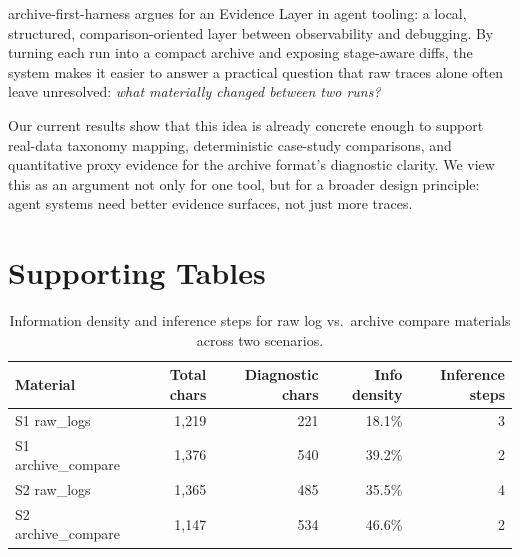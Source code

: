 \documentclass[11pt]{article}
\begin{document}
archive-first-harness argues for an Evidence Layer in agent tooling: a local, structured, comparison-oriented layer between observability and debugging. By turning each run into a compact archive and exposing stage-aware diffs, the system makes it easier to answer a practical question that raw traces alone often leave unresolved: \emph{what materially changed between two runs?}

Our current results show that this idea is already concrete enough to support real-data taxonomy mapping, deterministic case-study comparisons, and quantitative proxy evidence for the archive format's diagnostic clarity. We view this as an argument not only for one tool, but for a broader design principle: agent systems need better evidence surfaces, not just more traces.




\appendix

\section{Supporting Tables}
\label{app:case-studies}

\begin{table}[t!]
  \centering
  \small
  \begin{tabular}{lrrrr}
    \toprule
    \textbf{Material} & \textbf{Total chars} & \textbf{Diagnostic chars} & \textbf{Info density} & \textbf{Inference steps} \\
    \midrule
    S1 raw\_logs         & 1,219 & 221 & 18.1\% & 3 \\
    S1 archive\_compare  & 1,376 & 540 & 39.2\% & 2 \\
    S2 raw\_logs         & 1,365 & 485 & 35.5\% & 4 \\
    S2 archive\_compare  & 1,147 & 534 & 46.6\% & 2 \\
    \bottomrule
  \end{tabular}
  \caption{Information density and inference steps for raw log vs.\ archive compare materials across two scenarios.}
  \label{tab:info-density}
\end{table}
\end{document}
